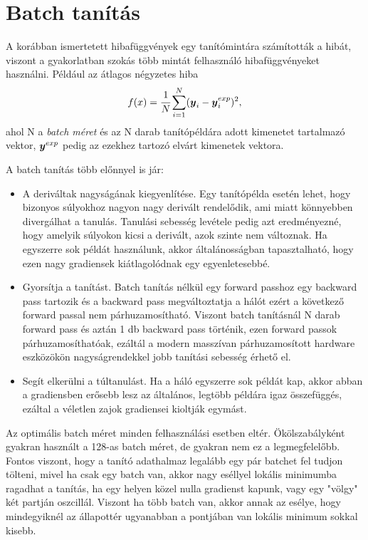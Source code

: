 \section{Batch tanítás}

A korábban ismertetett hibafüggvények egy tanítómintára számították a hibát, viszont a gyakorlatban szokás több mintát felhasználó hibafüggvényeket használni. Például az átlagos négyzetes hiba
\begin{equation}
    f(x) = \cfrac{1}{N}\sum^{N}_{i=1} (\boldsymbol y_i-\boldsymbol y^{exp}_i)^2,
\end{equation}
ahol N a \emph{batch méret} és \y az N darab tanítópéldára adott kimenetet tartalmazó vektor, $\boldsymbol y^{exp}$ pedig az ezekhez tartozó elvárt kimenetek vektora.

A batch tanítás több előnnyel is jár:
\begin{itemize}
    \item A deriváltak nagyságának kiegyenlítése. Egy tanítópélda esetén lehet, hogy bizonyos súlyokhoz nagyon nagy derivált rendelődik, ami miatt könnyebben divergálhat a tanulás. Tanulási sebesség levétele pedig azt eredményezné, hogy amelyik súlyokon kicsi a derivált, azok szinte nem változnak. Ha egyszerre sok példát használunk, akkor általánosságban tapasztalható, hogy ezen nagy gradiensek kiátlagolódnak egy egyenletesebbé.
    \item Gyorsítja a tanítást. Batch tanítás nélkül egy forward passhoz egy backward pass tartozik és a backward pass megváltoztatja a hálót ezért a következő forward passal nem párhuzamosítható. Viszont batch tanításnál N darab forward pass és aztán 1 db backward pass történik, ezen forward passok párhuzamosíthatóak, ezáltál a modern masszívan párhuzamosított hardware eszközökön nagyságrendekkel jobb tanítási sebesség érhető el.
    \item Segít elkerülni a túltanulást. Ha a háló egyszerre sok példát kap, akkor abban a gradiensben erősebb lesz az általános, legtöbb példára igaz összefüggés, ezáltal a véletlen zajok gradiensei kioltják egymást. 
\end{itemize}

Az optimális batch méret minden felhasználási esetben eltér. Ökölszabályként gyakran használt a 128-as batch méret, de gyakran nem ez a legmegfelelőbb. Fontos viszont, hogy a tanító adathalmaz legalább egy pár batchet fel tudjon tölteni, mivel ha csak egy batch van, akkor nagy eséllyel lokális minimumba ragadhat a tanítás, ha egy helyen közel nulla gradienst kapunk, vagy egy "völgy" két partján oszcillál. Viszont ha több batch van, akkor annak az esélye, hogy mindegyiknél az állapottér ugyanabban a pontjában van lokális minimum sokkal kisebb.

